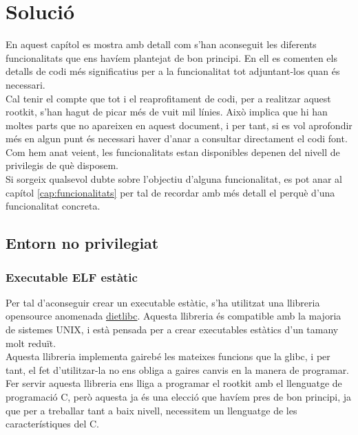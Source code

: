 \chapter{Solució}

En aquest capítol es mostra amb detall com s'han aconseguit les diferents funcionalitats que ens havíem 
plantejat de bon principi. En ell es comenten els detalls de codi més significatius per a la funcionalitat
tot adjuntant-los quan és necessari. \\

Cal tenir el compte que tot i el reaprofitament de codi, per a realitzar aquest rootkit, s'han hagut de 
picar més de vuit mil línies. Això implica que hi han moltes parts que no apareixen en aquest document, i
per tant, si es vol aprofondir més en algun punt és necessari haver d'anar a consultar directament el codi 
font. \\

Com hem anat veient, les funcionalitats estan disponibles depenen del nivell de privilegis de què disposem. \\

Si sorgeix qualsevol dubte sobre l'objectiu d'alguna funcionalitat, es pot anar al capítol \ref{cap:funcionalitats} per tal de recordar amb més 
detall el perquè d'una funcionalitat concreta. \\

\section{Entorn no privilegiat}

\subsection{Executable ELF estàtic}

Per tal d'aconseguir crear un executable estàtic, s'ha utilitzat una llibreria opensource anomenada 
\href{http://www.google.es/url?sa=t&source=web&ct=res&cd=1&url=http%3A%2F%2Fwww.fefe.de%2Fdietlibc%2F&ei=zZRQStz4PMWrjAftmrinBQ&usg=AFQjCNFno9JYqJ06mbfgwKIZS5J-6zPYEw&sig2=WuvuDzhCaMMslcwtL4xa2A}{\mbox{dietlibc}}.
Aquesta llibreria és compatible amb la majoria de sistemes UNIX, i està pensada per a crear executables estàtics d'un tamany 
molt reduït. \\

Aquesta llibreria implementa gairebé les mateixes funcions que la glibc, i per tant, el fet d'utilitzar-la no ens obliga a gaires canvis en la manera de programar. Fer servir aquesta llibreria
ens lliga a programar el rootkit amb el llenguatge de programació C, però aquesta ja és una elecció que havíem pres de bon principi, ja que per a treballar tant a baix nivell,
necessitem un llenguatge de les característiques del C.\\


